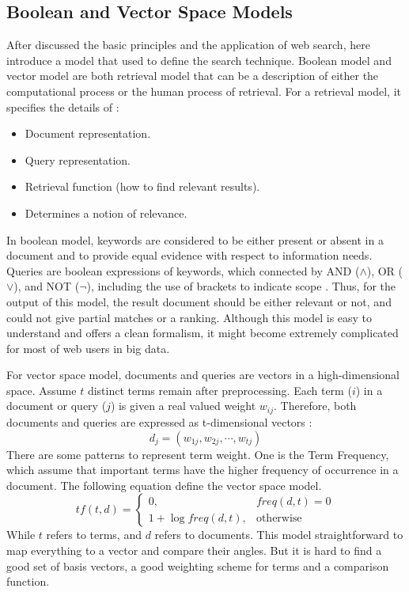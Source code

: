 \documentclass[sigconf]{acmart}
\begin{document}
\subsection{Boolean and Vector Space Models}

After discussed the basic principles and the application of web search, here introduce a model that used to define the search technique. Boolean model and vector model are both retrieval model that can be a description of either the computational process or the human process of retrieval. For a retrieval model, it specifies the details of \cite{editor07}: 
\begin{itemize}
\item Document representation.
\item Query representation.
\item Retrieval function (how to find relevant results).
\item Determines a notion of relevance.
\end{itemize}  

In boolean model, keywords are considered to be either present or absent in a
document and to provide equal evidence with respect to information needs. Queries are boolean expressions of keywords, which connected by AND ($\wedge$), OR ($\vee$), and NOT ($\neg$), including the use of brackets to indicate scope \cite{editor07}. Thus, for the output of this model, the result document should be either relevant or not, and could not give partial matches or a ranking. Although this model is easy to understand and offers a clean formalism, it might become extremely complicated for most of web users in big data.

For vector space model, documents and queries are vectors in a high-dimensional space. Assume $t$ distinct terms remain after preprocessing. Each term ($i$) in a document or query ($j$) is given a real valued weight $w_{ij}$. Therefore, both documents and queries are expressed as t-dimensional vectors \cite{editor07}:
\[d_j=(w_{1j},w_{2j},\cdots,w_{tj})\]
There are some patterns to represent term weight. One is the Term Frequency, which assume that important terms have the higher frequency of occurrence in a document. The following equation define the vector space model.
\[tf(t,d)=
  \begin{cases}
    0, & freq(d,t)=0 \\
    1+\log{freq(d,t)}, & \text{otherwise}
  \end{cases}
\]
While $t$ refers to terms, and $d$ refers to documents. This model straightforward to map everything to a vector and compare their angles. But it is hard to find a good set of basis vectors, a good weighting scheme for terms and a comparison function.
\end{document}
